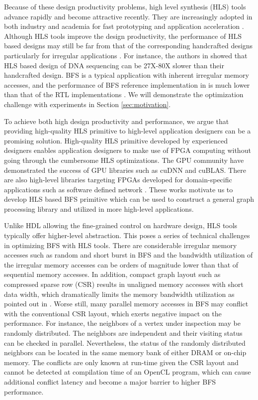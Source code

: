 Because of these design productivity problems, high level synthesis (HLS) 
tools advance rapidly and become attractive recently. They are increasingly adopted 
in both industry and academia for fast prototyping and application acceleration 
\cite{koch2016fpgas, xilinx-sdaccel, hls2016survey}. Although HLS tools improve the design productivity, 
the performance of HLS based designs may still be far from that of the corresponding 
handcrafted designs particularly for irregular applications \cite{wu2019fpga, gautier2016spector}. 
For instance, the authors in \cite{wu2019fpga} showed that HLS based design of DNA sequencing can be 27X-80X 
slower than their handcrafted design. BFS is a typical application with inherent irregular 
memory accesses, and the performance of BFS reference implementation in \cite{gautier2016spector} 
is much lower than that of the RTL implementations \cite{dai2016fpgp, Dai2017foregraph}. 
We will demonstrate the optimization challenge with experiments in Section \ref{sec:motivation}. 

To achieve both high design productivity and performance, we argue that 
providing high-quality HLS primitive to high-level application designers 
can be a promising solution. High-quality HLS primitive developed by 
experienced designers enables application designers to make use of FPGA 
computing without going through the cumbersome HLS optimizations. 
The GPU community have demonstrated the success of GPU libraries such as 
cuDNN\cite{cudnn} and cuBLAS\cite{cublas}. There are also high-level libraries 
targeting FPGAs developed for domain-specific applications such as software 
defined network \cite{bosshart2014p4, li2016clicknp, sultana2017emu}. 
These works motivate us to develop HLS based BFS 
primitive which can be used to construct a general graph processing 
library and utilized in more high-level applications. 

Unlike HDL allowing the fine-grained control on hardware design, 
HLS tools typically offer higher-level abstraction. This poses a series 
of technical challenges in optimizing BFS with HLS tools.
There are considerable irregular memory accesses such as 
random and short burst in BFS and the bandwidth utilization 
of the irregular memory accesses can be orders of magnitude lower than 
that of sequential memory accesses. In addition, compact graph layout such as 
compressed sparse row (CSR) results in unaligned memory accesses with short data 
width, which dramatically limits the memory bandwidth utilization as pointed out 
in \cite{wang2017multikernel}. Worse still, many parallel memory accesses in BFS 
may conflict with the conventional CSR layout, which exerts negative impact on 
the performance. For instance, the neighbors of a vertex under inspection may 
be randomly distributed. The neighbors are independent and their visiting status 
can be checked in parallel. Nevertheless, the status of the randomly distributed 
neighbors can be located in the same memory bank of either DRAM or on-chip 
memory. The conflicts are only known at run-time given the CSR 
layout and cannot be detected at compilation time of an OpenCL program,
which can cause additional conflict latency and become a 
major barrier to higher BFS performance. 

